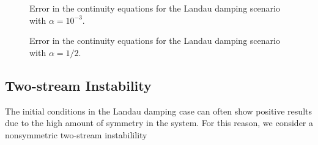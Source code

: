 \begin{figure}
    \centering
    \begin{subfigure}{0.45\textwidth}
    \end{subfigure}
    \begin{subfigure}{0.45\textwidth}
    \end{subfigure}
    \begin{subfigure}{0.45\textwidth}
    \end{subfigure}
    \begin{subfigure}{0.45\textwidth}
    \end{subfigure}
    \caption{
        Error in the continuity equations for the Landau damping scenario with 
        $\alpha = 10^{-3}$. 
    }\label{fig:moments_linear_landau}
\end{figure}

\begin{figure}
    \centering
    \begin{subfigure}{0.45\textwidth}
    \end{subfigure}
    \begin{subfigure}{0.45\textwidth}
    \end{subfigure}
    \begin{subfigure}{0.45\textwidth}
    \end{subfigure}
    \begin{subfigure}{0.45\textwidth}
    \end{subfigure}
    \caption{
        Error in the continuity equations for the Landau damping scenario with 
        $\alpha = 1/2$. 
    }\label{fig:moments_nonlinear_landau}
\end{figure}

\subsection{Two-stream Instability}\label{sec:two_stream}

The initial conditions in the Landau damping case can often show positive results 
due to the high amount of symmetry in the system. For this reason, we consider a 
nonsymmetric two-stream instabilility 

